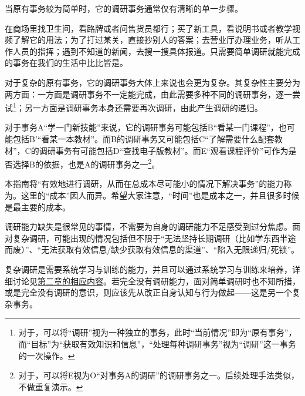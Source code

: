 当原有事务较为简单时，它的调研事务通常仅有清晰的单一步骤。
\begin{examples}
在商场里找卫生间，看路牌或者问售货员都行；买了新工具，看说明书或者教学视频了解它的用法；为了打过某关，直接抄别人的答案；去营业厅办理业务，听从工作人员的指挥；遇到不知道的新闻，去搜一搜具体报道。只需要简单调研就能完成的事务在我们的生活中比比皆是。
\end{examples}
对于复杂的原有事务，它的调研事务大体上来说也会更为复杂。其复杂性主要分为两方面：一方面是调研事务不一定能完成，由此需要多种不同的调研事务，逐一尝试\footnote{对于\rigorous，可以将“调研”视为一种独立的事务，此时“当前情况”即为“原有事务”，而“目标”为“获取有效知识和信息”，“处理每种调研事务”视为“调研”这一事务的一次操作。}；另一方面是调研事务本身还需要再次调研，由此产生调研的递归。
\begin{examples}
    对于事务A“学一门新技能”来说，它的调研事务可能包括B“看某一门课程”，也可能包括B'“看某一本教材”。而B的调研事务又可能包括C“了解需要什么配套教材”，C的调研事务有可能包括D“查找电子版教材”。而E“观看课程评价”可作为是否选择B的依据，也是A的调研事务之一\footnote{对于\rigorous，可以将E视为O“对事务A的调研”的调研事务之一。后续处理手法类似，不做重复演示。}。
\end{examples}
本指南将“有效地进行调研，从而在总成本尽可能小的情况下解决事务”的能力称为。这里的“成本”因人而异。希望大家注意，“时间”也是成本之一，并且很多时候是最主要的成本。

调研能力缺失是很常见的事情，不需要为自身的调研能力不足感受到过分焦虑。面对复杂调研，可能出现的情况包括但不限于“无法坚持长期调研（比如学东西半途而废）”、“无法获取有效信息/缺少获取有效信息的渠道”、“陷入无限递归/死锁”。

复杂调研是需要系统学习与训练的能力，并且可以通过系统学习与训练来培养，详细讨论见\hyperref[sec:识别方法与判断]{第二章的相应内容}。若完全没有调研能力，面对简单调研时也不知所措，或是完全没有调研的意识，则应该先从改正自身认知与行为做起——这是另一个复杂事务。

